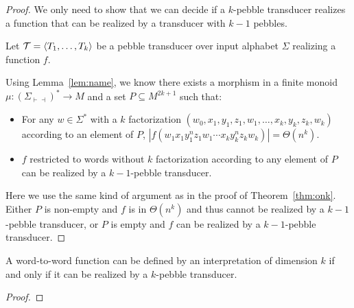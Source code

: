 \begin{proof}
    We only need to show that we can decide if a $k$-pebble transducer realizes a function that can be realized by a transducer with $k-1$ pebbles.

    Let ${\mathcal T}=\langle T_1,\ldots,T_k \rangle$ be a pebble transducer over input alphabet $\Sigma$ realizing a function $f$.

    Using Lemma~\ref{lem:name}, we know there exists a morphism in a finite monoid $\mu:(\Sigma_{\vdash\dashv})^*\rightarrow M$ and a set $P\subseteq M^{2k+1}$ such that:
    \begin{itemize}
    \item For any $w\in \Sigma^*$ with a $k$ factorization 
    $(w_0,x_{1},y_1,z_1,w_1,\ldots,x_k,y_k,z_k, w_k)$ according to an element of $P$, $|f(w_1x_1y_{1}^nz_1w_1\cdots x_ky_k^nz_kw_k)|=\Theta(n^k)$.
    \item $f$ restricted to words without $k$ factorization according to any element of $P$ can be realized by a $k{-}1$-pebble transducer.
    \end{itemize}
    Here we use the same kind of argument as in the proof of Theorem~\ref{thm:onk}. Either $P$ is non-empty and $f$ is in $\Theta(n^k)$ and thus cannot be realized by a $k{-}1$-pebble transducer, or $P$ is empty and $f$ can be realized by a $k{-}1$-pebble transducer.
\end{proof}



\begin{theorem}
    A word-to-word function can be defined by an \mso interpretation of dimension $k$ if and only if it can be realized by a $k$-pebble transducer.
\end{theorem}

\begin{proof}
\end{proof}